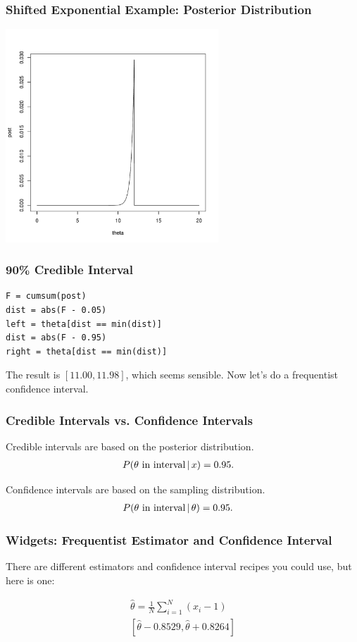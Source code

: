 \documentclass{beamer}
\newcommand{\given}{\,|\,}
\begin{document}
\begin{frame}[fragile]
\frametitle{Shifted Exponential Example: Posterior Distribution}
\centering
\includegraphics[width=0.6\textwidth]{images/widget_posterior.pdf}

\end{frame}


\begin{frame}[fragile]
\frametitle{90\% Credible Interval}

\begin{verbatim}
F = cumsum(post)
dist = abs(F - 0.05)
left = theta[dist == min(dist)]
dist = abs(F - 0.95)
right = theta[dist == min(dist)]
\end{verbatim}
\pause

The result is $[11.00, 11.98]$, which seems sensible.
Now let's do a frequentist confidence interval.
\end{frame}


\begin{frame}[fragile]
\frametitle{Credible Intervals vs. Confidence Intervals}
Credible intervals are based on the posterior distribution.
\begin{align}
P(\theta \textnormal{ in interval} \given x)
    &= 0.95.
\end{align}

\pause

Confidence intervals are based on the sampling distribution.
\begin{align}
P(\theta \textnormal{ in interval} \given \theta)
    &= 0.95.
\end{align}

\end{frame}


\begin{frame}[fragile]
\frametitle{Widgets: Frequentist Estimator and Confidence Interval}
There are different estimators and confidence interval recipes you could use,
but here is one:

\begin{align}
\hat{\theta} = \frac{1}{N}\sum_{i=1}^N (x_i - 1) \\
[\hat{\theta} - 0.8529, \hat{\theta} + 0.8264]
\end{align}

\end{frame}
\end{document}

